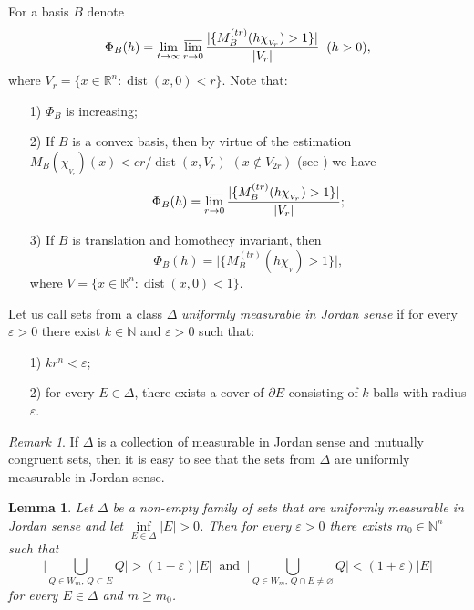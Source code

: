 \documentclass[12pt,reqno]{article}
\newtheorem{lemma}{Lemma}
\theoremstyle{remark}
\newtheorem{remark}{Remark}
\newcommand{\dist}{\operatorname{dist}}
\newcommand{\olim}{\operatornamewithlimits{\overline{lim}}}
\begin{document}
For a basis $B$ denote
$$  \Phi_B(h)=\lim_{t\to\infty} \olim_{r\to 0} \frac{|\{M_B^{(tr)}(h\chi_{{}_{V_r}})>1\}|}{|V_r|} \;\; (h>0),      $$
where $V_r=\{x\in\mathbb{R}^n:\dist(x,0)<r\}$. Note that:
\begin{enumerate}
\item[1)] $\Phi_B$ is increasing;

\item[2)] If $B$ is a convex basis, then by virtue of the estimation $M_B(\chi_{{}_{V_r}})(x)< cr/\dist(x,V_r)$ $(x\not\in V_{2r})$ (see \cite[Lemma 1]{8}) we have
$$  \Phi_B(h)=\olim_{r\to 0} \frac{|\{M_B^{(tr)}(h\chi_{{}_{V_r}})>1\}|}{|V_r|};        $$

\item[3)] If $B$ is translation and homothecy invariant, then
$$  \Phi_B(h)=\big|\big\{M_B^{(tr)}(h\chi_{{}_{V}})>1\big\}\big|,     $$
where $V=\{x\in\mathbb{R}^n:\dist(x,0)<1\}$.
\end{enumerate}

Let us call sets from a class $\Delta$ \emph{uniformly measurable in Jordan sense} if for every $\varepsilon>0$ there exist $k\in\mathbb{N}$ and $\varepsilon>0$ such that:
\begin{enumerate}
\item[1)] $kr^n<\varepsilon$;

\item[2)] for every $E\in\Delta$, there exists a cover of $\partial E$ consisting of $k$ balls with radius $\varepsilon$.
\end{enumerate}

\begin{remark}\label{rem:1}
If $\Delta$ is a collection of measurable in Jordan sense and mutually congruent sets, then it is easy to see that the sets from $\Delta$ are uniformly measurable in Jordan sense.
\end{remark}

\begin{lemma}\label{lem:7}
Let $\Delta$ be a non-empty family of sets that are uniformly measurable in Jordan sense and let $\inf\limits_{E \in\Delta}|E|>0$. Then for every $\varepsilon>0$ there exists $m_0\in\mathbb{N}^n$ such that
$$  \Big|\bigcup_{Q\in W_m,\,Q\subset E} Q\Big|>(1-\varepsilon)|E| \;\;\text{and}\;\;
            \Big|\bigcup_{Q\in W_m,\,Q\cap E\neq\varnothing} Q\Big|<(1+\varepsilon)|E|      $$
for every $E\in\Delta$ and $m\geq m_0$.
\end{lemma}
\end{document}
